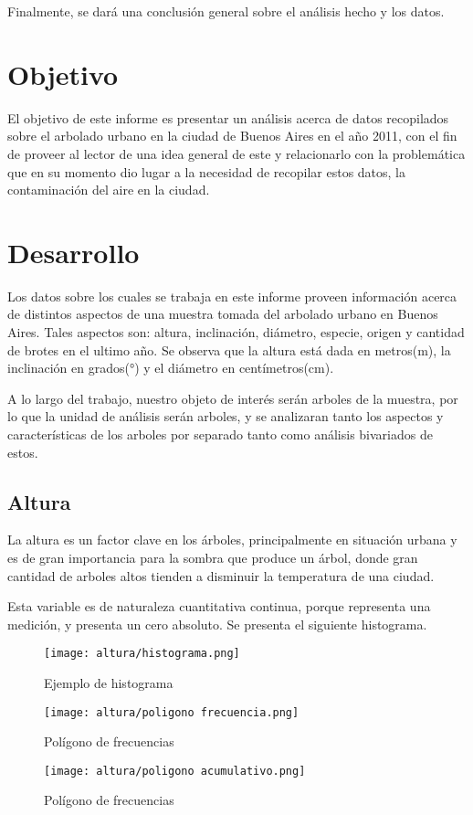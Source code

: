 \documentclass[a4paper]{article}
\begin{document}
Finalmente, se dará una conclusión general sobre el análisis hecho y los datos.

\section{Objetivo}
El objetivo de este informe es presentar un análisis acerca de datos recopilados
sobre el arbolado urbano en la ciudad de Buenos Aires en el año 2011, con el
fin de proveer al lector de una idea general de este y relacionarlo con la
problemática que en su momento dio lugar a la necesidad de recopilar estos datos,
la contaminación del aire en la ciudad.

\newpage

\section{Desarrollo}
Los datos sobre los cuales se trabaja en este informe proveen información acerca
de distintos aspectos de una muestra tomada del arbolado urbano en Buenos Aires.
Tales aspectos son: altura, inclinación, diámetro, especie, origen
y cantidad de brotes en el ultimo año. Se observa que la altura está dada en metros(m),
la inclinación en grados(°) y el diámetro en centímetros(cm).

A lo largo del trabajo, nuestro objeto de interés serán arboles de la muestra,
por lo que la unidad de análisis serán arboles, y se analizaran tanto los aspectos
y características de los arboles por separado tanto como análisis bivariados de estos.

\subsection{Altura}

La altura es un factor clave en los árboles, principalmente en situación urbana y
es de gran importancia para la sombra que produce un árbol, donde gran cantidad de
arboles altos tienden a disminuir la temperatura de una ciudad.

Esta variable es de naturaleza cuantitativa continua, porque representa una medición,
y presenta un cero absoluto.
Se presenta el siguiente histograma.

\begin{figure}[H]
    \centering
    \texttt{[image: altura/histograma.png]}
    \caption{Ejemplo de histograma}
    \label{fig:histograma altura}
\end{figure}
\begin{figure}[H]
    \centering
    \texttt{[image: altura/poligono frecuencia.png]}
    \caption{Polígono de frecuencias}
    \label{fig:poligono frecuencia altura}
\end{figure}
\begin{figure}[H]
    \centering
    \texttt{[image: altura/poligono acumulativo.png]}
    \caption{Polígono de frecuencias}
    \label{fig:poligono acumulativo altura}
\end{figure}
\end{document}
